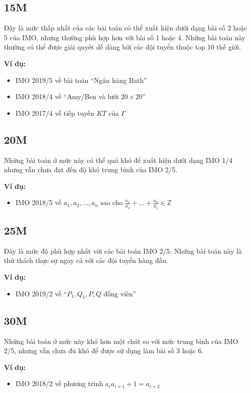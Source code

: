 \documentclass[../imo-training-open-book.tex]{subfiles}
\begin{document}
\subsection*{15M}
\label{app:15M}
Đây là mức thấp nhất của các bài toán có thể xuất hiện dưới dạng bài số 2 hoặc 5 của IMO, nhưng thường phù hợp hơn với bài số 1 hoặc 4.
Những bài toán này thường có thể được giải quyết dễ dàng bởi các đội tuyển thuộc top 10 thế giới.

\textbf{Ví dụ:}
\begin{itemize}
    \item IMO 2019/5 về bài toán ``Ngân hàng Bath''
    \item IMO 2018/4 về ``Amy/Ben và lưới $20 \times 20$''
    \item IMO 2017/4 về tiếp tuyến $KT$ của $\Gamma$
\end{itemize}

\subsection*{20M}
\label{app:20M}
Những bài toán ở mức này có thể quá khó để xuất hiện dưới dạng IMO 1/4 nhưng vẫn chưa đạt đến độ khó trung bình của IMO 2/5.

\textbf{Ví dụ:}
\begin{itemize}
    \item IMO 2018/5 về $a_1, a_2, \dots, a_n$ sao cho $\frac{a_1}{a_2} + \dots + \frac{a_n}{a_1} \in \mathbb{Z}$
\end{itemize}

\subsection*{25M}
\label{app:25M}
Đây là mức độ phù hợp nhất với các bài toán IMO 2/5. Những bài toán này là thử thách thực sự ngay cả với các đội tuyển hàng đầu.

\textbf{Ví dụ:}
\begin{itemize}
    \item IMO 2019/2 về ``$P_1, Q_1, P, Q$ đồng viên''
\end{itemize}

\subsection*{30M}
\label{app:30M}
Những bài toán ở mức này khó hơn một chút so với mức trung bình của IMO 2/5, nhưng vẫn chưa đủ khó để được sử dụng làm bài số 3 hoặc 6.

\textbf{Ví dụ:}
\begin{itemize}
    \item IMO 2018/2 về phương trình $a_i a_{i+1} + 1 = a_{i+2}$
\end{itemize}
\end{document}
